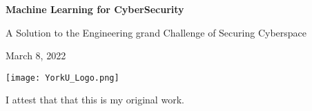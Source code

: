 \begin{titlepage}
    \begin{center}
        \vspace*{1cm}

        \Huge\textbf{Machine Learning for CyberSecurity}

        \vspace*{0.5cm}

        \LARGE A Solution to the Engineering grand Challenge of Securing Cyberspace

        \vspace*{1.5cm}

        \Large March 8, 2022

        \vfill

        \texttt{[image: YorkU\_Logo.png]}

        \vspace*{1cm}

        \large I attest that that this is my original work.
    \end{center}
\end{titlepage}
